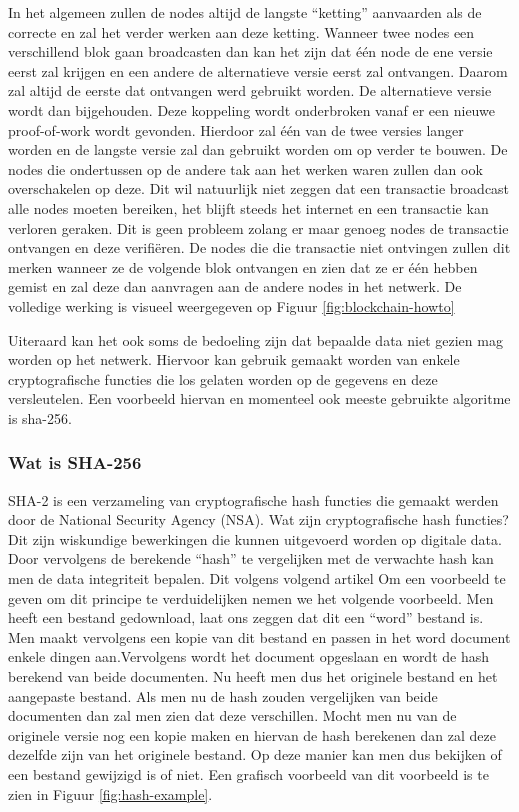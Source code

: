 In het algemeen zullen de nodes altijd de langste ``ketting'' aanvaarden als de correcte en zal het verder werken aan deze ketting. Wanneer twee nodes een verschillend blok gaan broadcasten dan kan het zijn dat één node de ene versie eerst zal krijgen en een andere de alternatieve versie eerst zal ontvangen. Daarom zal altijd de eerste dat ontvangen werd gebruikt worden. De alternatieve versie wordt dan bijgehouden. Deze koppeling wordt onderbroken vanaf er een nieuwe proof-of-work wordt gevonden. Hierdoor zal één van de twee versies langer worden en de langste versie zal dan gebruikt worden om op verder te bouwen. De nodes die ondertussen op de andere tak aan het werken waren zullen dan ook overschakelen op deze. Dit wil natuurlijk niet zeggen dat een transactie broadcast alle nodes moeten bereiken, het blijft steeds het internet en een transactie kan verloren geraken. Dit is geen probleem zolang er maar genoeg nodes de transactie ontvangen en deze verifiëren. De nodes die die transactie niet ontvingen zullen dit merken wanneer ze de volgende blok ontvangen en zien dat ze er één hebben gemist en zal deze dan aanvragen aan de andere nodes in het netwerk. De volledige werking is visueel weergegeven op Figuur \ref{fig:blockchain-howto}

Uiteraard kan het ook soms de bedoeling zijn dat bepaalde data niet gezien mag worden op het netwerk. Hiervoor kan gebruik gemaakt worden van enkele cryptografische functies die los gelaten worden op de gegevens en deze versleutelen. Een voorbeeld hiervan en momenteel ook meeste gebruikte algoritme  is sha-256. 

\subsubsection{Wat is SHA-256}
SHA-2 is een verzameling van cryptografische hash functies die gemaakt werden door de National Security Agency (NSA). Wat zijn cryptografische hash functies? Dit zijn wiskundige bewerkingen die kunnen uitgevoerd worden op digitale data. Door vervolgens de berekende ``hash'' te vergelijken met de verwachte hash kan men de data integriteit bepalen. Dit volgens volgend artikel \textcite{Fisher2017} Om een voorbeeld te geven om dit principe te verduidelijken nemen we het volgende voorbeeld. Men heeft een bestand gedownload, laat ons zeggen dat dit een ``word'' bestand is. Men maakt vervolgens een kopie van dit bestand en passen in het word document enkele dingen aan.Vervolgens wordt het document opgeslaan en wordt de hash berekend van beide documenten. Nu heeft men dus het originele bestand en het aangepaste bestand. Als men nu de hash zouden vergelijken van beide documenten dan zal men zien dat deze verschillen. Mocht men nu van de originele versie nog een kopie maken en hiervan de hash berekenen dan zal deze dezelfde zijn van het originele bestand. Op deze manier kan men dus bekijken of een bestand gewijzigd is of niet. Een grafisch voorbeeld van dit voorbeeld is te zien in Figuur \ref{fig:hash-example}.

